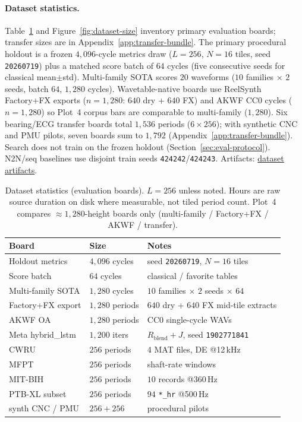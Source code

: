 \paragraph{Dataset statistics.}
Table~\ref{tab:dataset-stats} and Figure~\ref{fig:dataset-size} inventory primary evaluation boards; transfer sizes are in Appendix~\ref{app:transfer-bundle}.
The primary procedural holdout is a frozen $4{,}096$-cycle metrics draw ($L{=}256$, $N{=}16$ tiles, seed \texttt{20260719}) plus a matched score batch of $64$ cycles (five consecutive seeds for classical mean$\pm$std).
Multi-family SOTA scores $20$ waveforms ($10$ families $\times$ $2$ seeds, batch $64$, $1{,}280$ cycles).
Wavetable-native boards use ReelSynth Factory+FX exports ($n{=}1{,}280$: $640$ dry + $640$ FX) and AKWF CC0 cycles ($n{=}1{,}280$) so Plot~4 corpus bars are comparable to multi-family ($1{,}280$).
Six bearing/ECG transfer boards total $1{,}536$ periods ($6{\times}256$); with synthetic CNC and PMU pilots, seven boards sum to $1{,}792$ (Appendix~\ref{app:transfer-bundle}).
Search does not train on the frozen holdout (Section~\ref{sec:eval-protocol}). N2N/seq baselines use disjoint train seeds \texttt{424242}/\texttt{424243}.
Artifacts: \href{https://github.com/reeldemo/denoise-opt}{dataset artifacts}.

\begin{table}[tbp]
  \centering
  \caption{Dataset statistics (evaluation boards).
    $L{=}256$ unless noted. Hours are raw source duration on disk where measurable, not tiled period count.
    Plot~4 compares ${\approx}1{,}280$-height boards only (multi-family / Factory+FX / AKWF / transfer).}
  \label{tab:dataset-stats}
  \setlength{\tabcolsep}{3pt}
\begin{tabular}{@{}llp{}@{}}
    \toprule
    Board & Size & Notes \\
    \midrule
    Holdout metrics & $4{,}096$ cycles & seed \texttt{20260719}, $N{=}16$ tiles \\
    Score batch & $64$ cycles & classical / favorite tables \\
    Multi-family SOTA & $1{,}280$ cycles & $10$ families $\times$ $2$ seeds $\times$ $64$ \\
    Factory+FX export & $1{,}280$ periods & $640$ dry + $640$ FX mid-tile extracts \\
    AKWF OA & $1{,}280$ periods & CC0 single-cycle WAVs \\
    Meta hybrid\_lstm & $1{,}200$ iters & $R_{\mathrm{blend}}{+}J$, seed \texttt{1902771841} \\
    CWRU & $256$ periods & $4$ MAT files, DE @12\,kHz \\
    MFPT & $256$ periods & shaft-rate windows \\
    MIT-BIH & $256$ periods & $10$ records @360\,Hz \\
    PTB-XL subset & $256$ periods & $94$ \texttt{*\_hr} @500\,Hz \\
    synth CNC / PMU & $256{+}256$ & procedural pilots \\
    \bottomrule
  \end{tabular}
\end{table}

